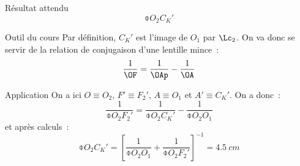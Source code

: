 \documentclass[a4paper, 12pt, final, garamond]{book}
\begin{document}
\subsubsection{}

\begin{tcbraster}[raster columns=6, raster equal height=rows]
    \begin{tcolorbox}[blankest, raster multicolumn=3, space to=\myspacee]
        \begin{tcbraster}[raster columns=1]
            \begin{NCprop}[raster multicolumn=1,
                add to natural height=\myspacee]{Résultat attendu}
                $$\obar{O_2C_K'}$$
            \end{NCprop}
            \begin{NCrapp}[raster multicolumn=2]{Outil du cours}
                Par définition, $C_K'$ est l'image de $O_1$ par $\Lc_2$. On va
                donc se servir de la relation de conjugaison d'une lentille
                mince~:
                \[ \frac{1}{\OF} = \frac{1}{\OAp} - \frac{1}{\OA} \]
            \end{NCrapp}
        \end{tcbraster}
    \end{tcolorbox}
    \begin{NCexem}[raster multicolumn=3]{Application}
        On a ici $O \equiv O_2$, $F' \equiv F_2'$, $A \equiv O_1$ et $A' \equiv
        C_K'$. On a donc~:
        \[ \frac{1}{\obar{O_2F_2'}} = \frac{1}{\obar{O_2C_K'}} -
        \frac{1}{\obar{O_2O_1}} \]
        et après calculs~:
        \[ \boxed{\obar{O_2C_K'} = \left[ \frac{1}{\obar{O_2O_1}} +
        \frac{1}{\obar{O_2F_2'}}\right]^{-1} = \SI{+4.5}{cm}} \]
    \end{NCexem}
\end{tcbraster}
\end{document}
